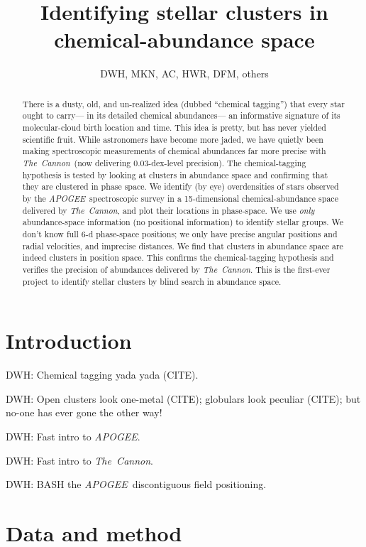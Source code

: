 \documentclass[12pt, letterpaper, preprint]{aastex}
\newcommand{\acronym}[1]{{\small{#1}}}
\newcommand{\project}[1]{\textsl{#1}}
\newcommand{\apogee}{\acronym{\project{APOGEE}}}
\newcommand{\thecannon}{\project{The~Cannon}}
\begin{document}
\title{Identifying stellar clusters in chemical-abundance space}
\author{DWH, MKN, AC, HWR, DFM, others}

\begin{abstract}
There is a dusty, old, and un-realized idea (dubbed ``chemical tagging'')
that every star ought to carry---%
in its detailed chemical abundances---%
an informative signature of its molecular-cloud birth location and time.
This idea is pretty, but has never yielded scientific fruit.
While astronomers have become more jaded, we have quietly been making
spectroscopic measurements of chemical abundances far more precise with \thecannon\ 
(now delivering 0.03-dex-level precision).
The chemical-tagging hypothesis is tested by looking at clusters in abundance space
and confirming that they are clustered in phase space.
We identify (by eye) overdensities of stars observed by the \apogee\ spectroscopic survey
in a 15-dimensional chemical-abundance space delivered by \thecannon,
and plot their locations in phase-space.
We use \emph{only} abundance-space information (no positional information) to identify stellar groups.
We don't know full 6-d phase-space positions;
we only have precise angular positions and radial velocities, and imprecise distances.
We find that clusters in abundance space are indeed clusters in position space.
This confirms the chemical-tagging hypothesis and
verifies the precision of abundances delivered by \thecannon.
This is the first-ever project to identify stellar clusters by blind search in abundance space.
\end{abstract}

\section{Introduction}

DWH: Chemical tagging yada yada (CITE).

DWH: Open clusters look one-metal (CITE); globulars look peculiar (CITE); but no-one has ever gone the other way! 

DWH: Fast intro to \apogee.

DWH: Fast intro to \thecannon.

DWH: BASH the \apogee\ discontiguous field positioning.

\section{Data and method}
\end{document}
